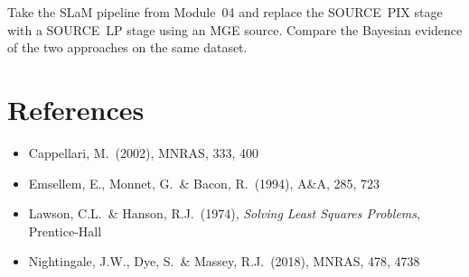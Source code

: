 \documentclass[11pt, letterpaper]{article}
\begin{document}
\begin{exercisebox}
Take the SLaM pipeline from Module~04 and replace the SOURCE~PIX stage
with a SOURCE~LP stage using an MGE source.  Compare the Bayesian
evidence of the two approaches on the same dataset.
\end{exercisebox}

\section*{References}

\begin{itemize}[nosep, leftmargin=*]
  \item Cappellari, M.\ (2002), MNRAS, 333, 400
  \item Emsellem, E., Monnet, G.\ \& Bacon, R.\ (1994), A\&A, 285, 723
  \item Lawson, C.L.\ \& Hanson, R.J.\ (1974),
    \textit{Solving Least Squares Problems}, Prentice-Hall
  \item Nightingale, J.W., Dye, S.\ \& Massey, R.J.\ (2018), MNRAS, 478, 4738
\end{itemize}
\end{document}
